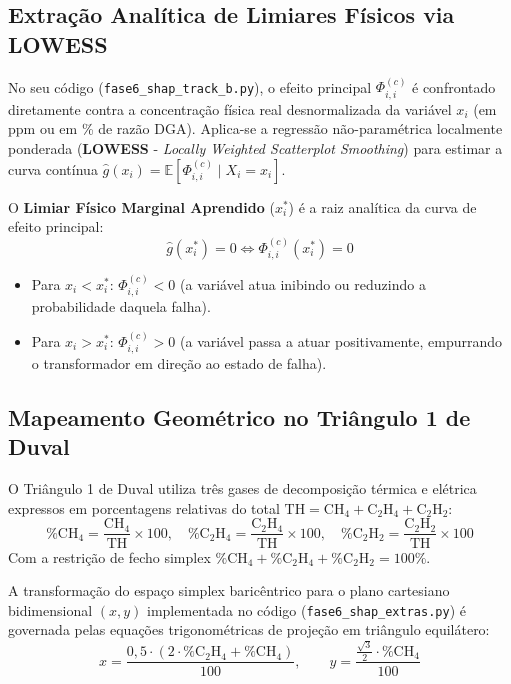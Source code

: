 \documentclass[11pt,a4paper]{article}
\begin{document}
\subsection{Extração Analítica de Limiares Físicos via LOWESS}

No seu código (\texttt{fase6\_shap\_track\_b.py}), o efeito principal $\Phi_{i, i}^{(c)}$ é confrontado diretamente contra a concentração física real desnormalizada da variável $x_i$ (em ppm ou em \% de razão DGA). Aplica-se a regressão não-paramétrica localmente ponderada (\textbf{LOWESS} - \textit{Locally Weighted Scatterplot Smoothing}) para estimar a curva contínua $\hat{g}(x_i) = \mathbb{E}[\Phi_{i, i}^{(c)} \mid X_i = x_i]$.

O \textbf{Limiar Físico Marginal Aprendido} ($x_i^*$) é a raiz analítica da curva de efeito principal:
$$\hat{g}(x_i^*) = 0 \iff \Phi_{i, i}^{(c)}(x_i^*) = 0$$

\begin{itemize}[leftmargin=*]
  \item Para $x_i < x_i^*$: $\Phi_{i, i}^{(c)} < 0$ (a variável atua inibindo ou reduzindo a probabilidade daquela falha).
  \item Para $x_i > x_i^*$: $\Phi_{i, i}^{(c)} > 0$ (a variável passa a atuar positivamente, empurrando o transformador em direção ao estado de falha).
\end{itemize}

\subsection{Mapeamento Geométrico no Triângulo 1 de Duval}

O Triângulo 1 de Duval utiliza três gases de decomposição térmica e elétrica expressos em porcentagens relativas do total $\text{TH} = \text{CH}_4 + \text{C}_2\text{H}_4 + \text{C}_2\text{H}_2$:
$$\% \text{CH}_4 = \frac{\text{CH}_4}{\text{TH}} \times 100, \quad \% \text{C}_2\text{H}_4 = \frac{\text{C}_2\text{H}_4}{\text{TH}} \times 100, \quad \% \text{C}_2\text{H}_2 = \frac{\text{C}_2\text{H}_2}{\text{TH}} \times 100$$
Com a restrição de fecho simplex $\% \text{CH}_4 + \% \text{C}_2\text{H}_4 + \% \text{C}_2\text{H}_2 = 100\%$.

A transformação do espaço simplex baricêntrico para o plano cartesiano bidimensional $(x, y)$ implementada no código (\texttt{fase6\_shap\_extras.py}) é governada pelas equações trigonométricas de projeção em triângulo equilátero:
$$x = \frac{0{,}5 \cdot (2 \cdot \% \text{C}_2\text{H}_4 + \% \text{CH}_4)}{100}, \quad\quad y = \frac{\frac{\sqrt{3}}{2} \cdot \% \text{CH}_4}{100}$$
\end{document}
